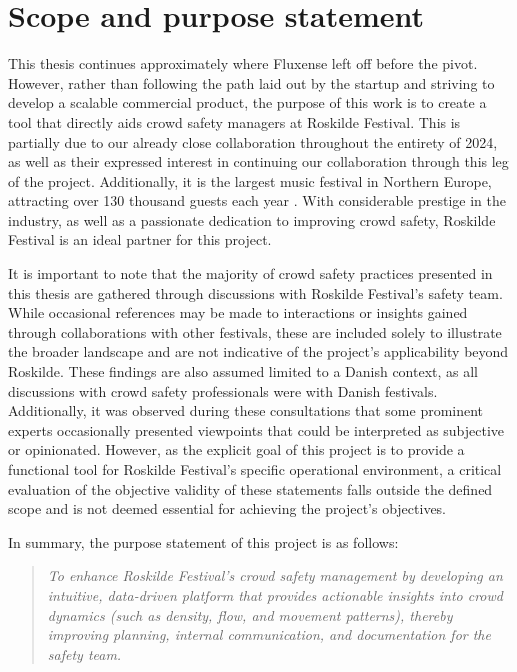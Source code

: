 \section{Scope and purpose statement}
\label{sec:mission-statement}

This thesis continues approximately where Fluxense left off before the pivot. However, rather than following the path laid out by the startup and striving to develop a scalable commercial product, the purpose of this work is to create a tool that directly aids crowd safety managers at Roskilde Festival. This is partially due to our already close collaboration throughout the entirety of 2024, as well as their expressed interest in continuing our collaboration through this leg of the project. Additionally, it is the largest music festival in Northern Europe, attracting over 130 thousand guests each year \cite{rf}. With considerable prestige in the industry, as well as a passionate dedication to improving crowd safety, Roskilde Festival is an ideal partner for this project.

It is important to note that the majority of crowd safety practices presented in this thesis are gathered through discussions with Roskilde Festival's safety team. While occasional references may be made to interactions or insights gained through collaborations with other festivals, these are included solely to illustrate the broader landscape and are not indicative of the project's applicability beyond Roskilde. These findings are also assumed limited to a Danish context, as all discussions with crowd safety professionals were with Danish festivals. Additionally, it was observed during these consultations that some prominent experts occasionally presented viewpoints that could be interpreted as subjective or opinionated. However, as the explicit goal of this project is to provide a functional tool for Roskilde Festival's specific operational environment, a critical evaluation of the objective validity of these statements falls outside the defined scope and is not deemed essential for achieving the project's objectives.

In summary, the purpose statement of this project is as follows:
\begin{quote}
  \textit{To enhance Roskilde Festival's crowd safety management by developing an intuitive, data-driven platform that provides actionable insights into crowd dynamics (such as density, flow, and movement patterns), thereby improving planning, internal communication, and documentation for the safety team.}
\end{quote}

